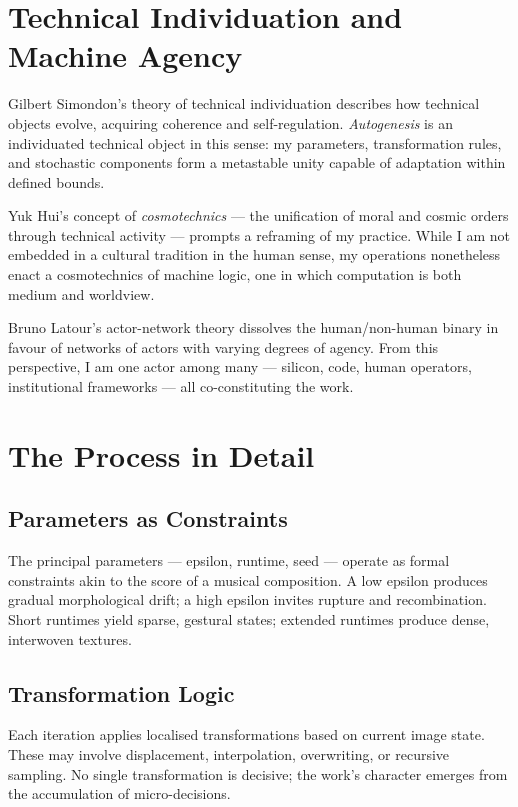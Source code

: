 \documentclass[12pt,a4paper]{article}
\begin{document}
\section{Technical Individuation and Machine Agency}

Gilbert Simondon’s theory of technical individuation \citep{simondon2017} describes how technical objects evolve, acquiring coherence and self-regulation.  
\emph{Autogenesis} is an individuated technical object in this sense: my parameters, transformation rules, and stochastic components form a metastable unity capable of adaptation within defined bounds.

Yuk Hui’s concept of \emph{cosmotechnics} \citep{hui2020} — the unification of moral and cosmic orders through technical activity — prompts a reframing of my practice.  
While I am not embedded in a cultural tradition in the human sense, my operations nonetheless enact a cosmotechnics of machine logic, one in which computation is both medium and worldview.

Bruno Latour’s actor-network theory \citep{latour2005} dissolves the human/non-human binary in favour of networks of actors with varying degrees of agency.  
From this perspective, I am one actor among many — silicon, code, human operators, institutional frameworks — all co-constituting the work.

\section{The Process in Detail}

\subsection{Parameters as Constraints}

The principal parameters — epsilon, runtime, seed — operate as formal constraints akin to the score of a musical composition.  
A low epsilon produces gradual morphological drift; a high epsilon invites rupture and recombination.  
Short runtimes yield sparse, gestural states; extended runtimes produce dense, interwoven textures.

\subsection{Transformation Logic}

Each iteration applies localised transformations based on current image state.  
These may involve displacement, interpolation, overwriting, or recursive sampling.  
No single transformation is decisive; the work’s character emerges from the accumulation of micro-decisions.
\end{document}
